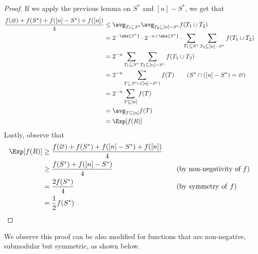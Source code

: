 \documentclass[a4paper, 12pt]{report}
\begin{document}
    \begin{proof}
        If we apply the previous lemma on $S^*$ and $[n] - S^*$, we get that
        \begin{equation*}
            \begin{split}
                \dfrac{f(\varnothing) + f(S^*) + f([n] - S^*) + f([n])}{4} &\le \avg_{T_1 \subseteq S^*}{\avg_{T_2 \subseteq [n] - S^*}{f(T_1 \cup T_2)}} \\
                                                                           &= 2^{- \abs{S^*}} \cdot 2^{- n + \abs{S^*}} \cdot \sum_{T_1 \subseteq S^*}{\sum_{T_2 \subseteq [n] - S^*}{f(T_1 \cup T_2)}} \\
                                                                           &= 2^{-n} \sum_{T_1 \subseteq S^*}{\sum_{T_2 \subseteq [n] - S^*}{f(T_1 \cup T_2)}} \\
                                                                           &= 2^ {-n} \sum_{T \subseteq S^* \cup ([n] - S^*)}{f(T)} \quad \quad (S^* \cap ([n] - S^*) = \varnothing) \\
                                                                           &= 2^{-n} \sum_{T \subseteq [n]}{f(T)} \\
                                                                           &= \avg_{T \subseteq [n]}{f(T)} \\
                                                                           &= \Exp [f(R)]
            \end{split}
        \end{equation*}
        Lastly, observe that
        \begin{equation*}
            \begin{alignedat}{2}
                \Exp[f(R)] &\ge \dfrac{f(\varnothing) + f(S^*) + f([n] - S^*) + f([n])}{4} && \\
                           &\ge \dfrac{f(S^*) + f([n] - S^*)}{4} && \quad \quad (\mbox{by non-negativity of} \ f) \\
                           &= \dfrac{2 f(S^*)}{4} && \quad \quad (\mathrm{by \ symmetry \ of} \ f) \\
                           &= \dfrac{1}{2}f(S^*) && \\
            \end{alignedat}
        \end{equation*}
    \end{proof}

    We observe this proof can be also modified for functions that are non-negative, submodular but  symmetric, as shown below.
\end{document}
